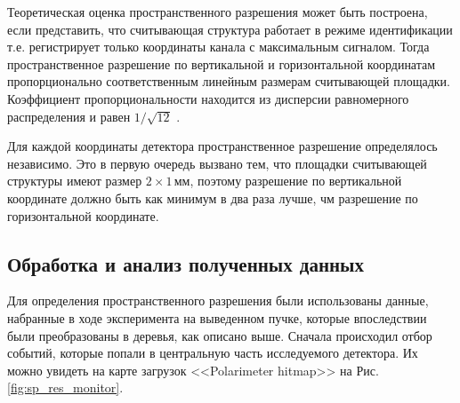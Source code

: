 \par Теоретическая оценка пространственного разрешения может быть построена, если представить, что считывающая структура работает в режиме идентификации т.е. регистрирует только координаты канала с максимальным сигналом. Тогда пространственное разрешение по вертикальной и горизонтальной координатам пропорционально соответственным линейным размерам считывающей площадки. Коэффициент пропорциональности находится из дисперсии равномерного распределения и равен $1/\sqrt{12}$ \cite{grupen}.
\par Для каждой координаты детектора пространственное разрешение определялось независимо. Это в первую очередь вызвано тем, что площадки считывающей структуры имеют размер $2\times1$\,мм, поэтому разрешение по вертикальной координате должно быть как минимум в два раза лучше, чм разрешение по горизонтальной координате. 

\subsection{Обработка и анализ полученных данных}
Для определения пространственного разрешения были использованы данные, набранные в ходе эксперимента на выведенном пучке, которые впоследствии были преобразованы в деревья, как описано выше. Сначала происходил отбор событий, которые попали в центральную часть исследуемого детектора. Их можно увидеть на карте загрузок <<Polarimeter hitmap>> на Рис. \ref{fig:sp_res_monitor}.

